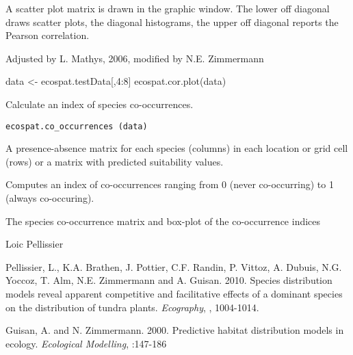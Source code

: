 \documentclass[a4paper]{book}
\begin{document}
%
\begin{Value}
A scatter plot matrix is drawn in the graphic window. The lower off diagonal draws scatter plots, the diagonal histograms, the upper off diagonal reports the Pearson correlation.
\end{Value}
%
\begin{Author}\relax
Adjusted by L. Mathys, 2006, modified by N.E. Zimmermann
\end{Author}
%
\begin{Examples}
\begin{ExampleCode}
data <- ecospat.testData[,4:8]
ecospat.cor.plot(data)
\end{ExampleCode}
\end{Examples}
%
\begin{Description}\relax
Calculate an index of species co-occurrences.
\end{Description}
%
\begin{Usage}
\begin{verbatim}
ecospat.co_occurrences (data)
\end{verbatim}
\end{Usage}
%
\begin{Arguments}
\begin{ldescription}
\item[\code{data}] A presence-absence matrix for each species (columns) in each location or grid cell (rows) or a matrix with predicted suitability values. 
\end{ldescription}
\end{Arguments}
%
\begin{Details}\relax
Computes an index of co-occurrences ranging from 0 (never co-occurring) to 1 (always co-occuring).
\end{Details}
%
\begin{Value}
The species co-occurrence matrix and box-plot of the co-occurrence indices
\end{Value}
%
\begin{Author}\relax
Loic Pellissier 
\end{Author}
%
\begin{References}\relax
Pellissier, L., K.A. Brathen, J. Pottier, C.F. Randin, P. Vittoz, A. Dubuis, N.G. Yoccoz, T. Alm, N.E. Zimmermann and A. Guisan. 2010. Species distribution models reveal apparent competitive and facilitative effects of a dominant species on the distribution of tundra plants. \emph{Ecography}, , 1004-1014.

Guisan, A. and N. Zimmermann. 2000. Predictive habitat distribution models in ecology. \emph{Ecological Modelling}, :147-186
\end{References}
\end{document}
